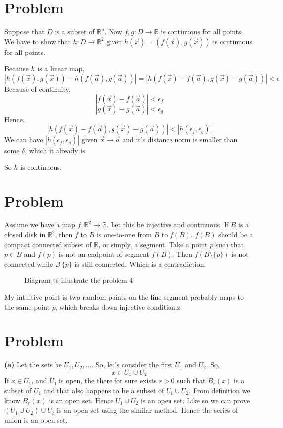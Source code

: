 \documentclass[letter]{article}
\begin{document}
\section{Problem}
Suppose that $D$ is a subset of $\mathbb{R}^{n}$. Now $f,g:D\to \mathbb{R}$ is continuous for all points. We have to show that $h:D\to \mathbb{R}^{2}$ given $h(\vec{x}) = (f(\vec{x}), g(\vec{x}))$ is continuous for all points. 

Because $h$ is a linear map, 
\[
|h(f(\vec{x}), g(\vec{x}))-h(f(\vec{a}), g(\vec{a})) |= |h(f(\vec{x}) - f(\vec{a}), g(\vec{x})-g(\vec{a}) )| < \epsilon
\] 
Because of continuity, 
\[
|f(\vec{x}) - f(\vec{a}) | < \epsilon_f
\] 
\[
|g(\vec{x}) - g(\vec{a}) | < \epsilon_g
\] 
Hence, 
\[|
h(
f(\vec{x})-f(\vec{a}), 
g(\vec{x})-g(\vec{a})
) |
< |h(\epsilon_f, \epsilon_g)|
\] 
We can have $|h(\epsilon_f, \epsilon_g)|$ given $\vec{x} \to  \vec{a}$ and it's distance norm is smaller than some $\delta$, which it already is. 

So $h$ is continuous. 

\section{Problem}
Assume we have a map $f: \mathbb{R}^{2} \to  \mathbb{R}$. Let this be injective and continuous. If $B$ is a closed disk in $\mathbb{R}^{2}$, then $f$ to $B$ is one-to-one from $B$ to $f(B)$. $f(B)$ should be a compact connected subset of $\mathbb{R}$, or simply, a segment. Take a point $p$ such that $p \in B$ and $f(p)$ is not an endpoint of segment $f(B)$. Then $f(B\setminus \{p\} )$ is not connected while $B \ \{p\} $ is still connected. Which is a contradiction.
\begin{figure}[ht]
    \centering
    \caption{Diagram to illustrate the problem 4}
    \label{fig:diagram-to-illustrate-the-problem-4}
\end{figure}
My intuitive point is two random points on the line segment probably maps to the same point $p$, which breaks down injective condition.z 

\section{Problem}
\textbf{(a)} Let the sets be $U_1, U_2, \ldots$. So, let's consider the first $U_1$ and $U_2$. So,
\[
x \in U_1 \cup U_2
\] 
If $x \in  U_1$, and $U_1$ is open, the there for sure exists $r>0$ such that $B_r(x)$ is a subset of $U_1$ and that also happens to be a subset of $U_1 \cup  U_2$. From definition we know $B_r(x)$ is an open set. Hence $U_1 \cup  U_2$ is an open set. Like so we can prove $(U_1 \cup  U_2) \cup U_3$ is an open set using the similar method. Hence the series of union is an open set. 
\end{document}
